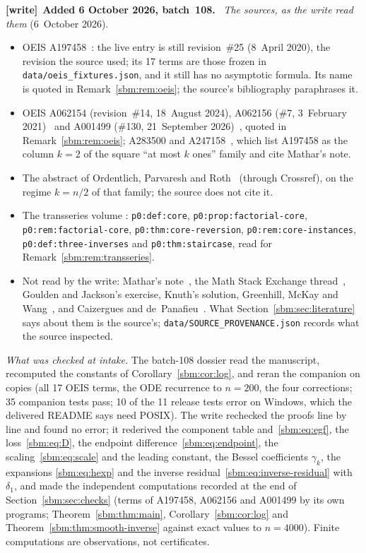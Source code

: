 \documentclass[11pt,letterpaper]{article}
\numberwithin{equation}{section}
\theoremstyle{remark}\newtheorem{remark}[theorem]{Remark}
\newcommand{\file}[1]{\nolinkurl{#1}}
\newenvironment{writenote}[1][]{\par\smallskip\begingroup\small
 \noindent\textbf{[write]}\if\relax\detokenize{#1}\relax\else~\textbf{#1.}\fi\ }%
 {\par\endgroup\smallskip}
\begin{document}
\begin{writenote}[Added 6 October 2026, batch~108]
\emph{The sources, as the write read them} (6~October 2026).
\begin{itemize}\raggedright
\item OEIS A197458~\cite{oeis}: the live entry is still revision~\#25
 (8~April 2020), the revision the source used; its 17 terms are those frozen
 in \file{data/oeis_fixtures.json}, and it still has no asymptotic formula.
 Its name is quoted in Remark~\ref{sbm:rem:oeis}; the source's bibliography
 paraphrases it.
\item OEIS A062154 (revision~\#14, 18~August 2024), A062156 (\#7,
 3~February 2021)~\cite{companion} and A001499 (\#130, 21~September
 2026)~\cite{regular}, quoted in Remark~\ref{sbm:rem:oeis}; A283500 and
 A247158~\cite{oeisk}, which list A197458 as the column $k=2$ of the square
 ``at most $k$ ones'' family and cite Mathar's note.
\item The abstract of Ordentlich, Parvaresh and Roth~\cite{opr} (through
 Crossref), on the regime $k=n/2$ of that family; the source does not cite it.
\item The transseries volume
 :
 \file{p0:def:core}, \file{p0:prop:factorial-core},
 \file{p0:rem:factorial-core}, \file{p0:thm:core-reversion},
 \file{p0:rem:core-instances}, \file{p0:def:three-inverses} and
 \file{p0:thm:staircase}, read for Remark~\ref{sbm:rem:transseries}.
\item Not read by the write: Mathar's note~\cite{mathar}, the Math Stack
 Exchange thread~\cite{mse}, Goulden and Jackson's exercise, Knuth's
 solution, Greenhill, McKay and Wang~\cite{gmw}, and Caizergues and
 de~Panafieu~\cite{cp}. What Section~\ref{sbm:sec:literature} says about them
 is the source's; \file{data/SOURCE_PROVENANCE.json} records what the source
 inspected.
\end{itemize}

\emph{What was checked at intake.} The batch-108 dossier read the
manuscript, recomputed the constants of Corollary~\ref{sbm:cor:log}, and
reran the companion on copies (all 17 OEIS terms, the ODE recurrence to
$n=200$, the four corrections; 35 companion tests pass; 10 of the 11 release
tests error on Windows, which the delivered README says need POSIX). The
write rechecked the proofs line by line and found no error; it rederived the
component table and~\eqref{sbm:eq:egf}, the loss~\eqref{sbm:eq:D}, the
endpoint difference~\eqref{sbm:eq:endpoint}, the scaling~\eqref{sbm:eq:scale}
and the leading constant, the Bessel coefficients $\gamma_k$, the expansions
\eqref{sbm:eq:hexp} and the inverse residual~\eqref{sbm:eq:inverse-residual}
with~$\delta_1$, and made the independent computations recorded at the end of
Section~\ref{sbm:sec:checks} (terms of A197458, A062156 and A001499 by its
own programs; Theorem~\ref{sbm:thm:main}, Corollary~\ref{sbm:cor:log} and
Theorem~\ref{sbm:thm:smooth-inverse} against exact values to $n=4000$).
Finite computations are observations, not certificates.


\end{writenote}
\end{document}
